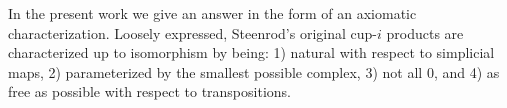 In the present work we give an answer in the form of an axiomatic characterization. Loosely expressed, Steenrod's original cup-$i$ products are characterized up to isomorphism by being: 1) natural with respect to simplicial maps, 2) parameterized by the smallest possible complex, 3) not all $0$, and 4) as free as possible with respect to transpositions.